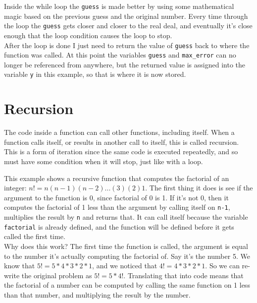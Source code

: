 Inside the while loop the \texttt{guess} is made better by using some mathematical magic based on the previous guess and the original number. Every time through the loop the \texttt{guess} gets closer and closer to the real deal, and eventually it's close enough that the loop condition causes the loop to stop.\\

After the loop is done I just need to return the value of \texttt{guess} back to where the function was called. At this point the variables \texttt{guess} and \texttt{max\_error} can no longer be referenced from anywhere, but the returned value is assigned into the variable \texttt{y} in this example, so that is where it is now stored.\\

\section{Recursion}

The code inside a function can call other functions, including itself. When a function calls itself, or results in another call to itself, this is called recursion. This is a form of iteration since the same code is executed repeatedly, and so must have some condition when it will stop, just like with a loop.\\


This example shows a recursive function that computes the factorial of an integer: \(n! = n(n-1)(n-2)...(3)(2)1\). The first thing it does is see if the argument to the function is  0, since factorial of 0 is 1. If it's not 0, then it computes the factorial of 1 less than the argument by calling itself on \texttt{n-1}, multiplies the result by \texttt{n} and returns that. It can call itself because the variable \texttt{factorial} is already defined, and the function will be defined before it gets called the first time.\\

Why does this work? The first time the function is called, the argument is equal to the number it's actually computing the factorial of. Say it's the number 5. We know that \(5! = 5*4*3*2*1\), and we noticed that \(4! = 4*3*2*1\). So we can re-write the original problem as \(5! = 5*4!\). Translating that into code means that the factorial of a number can be computed by calling the same function on 1 less than that number, and multiplying the result by the number.\\

